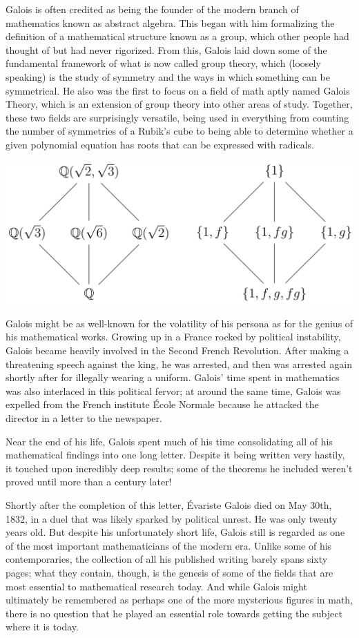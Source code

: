 \documentclass{article}
\begin{document}
Galois is often credited as being the founder of the modern branch of mathematics known as abstract algebra. This began with him formalizing the definition of a mathematical structure known as a group, which other people had thought of but had never rigorized. From this, Galois laid down some of the fundamental framework of what is now called group theory, which (loosely speaking) is the study of symmetry and the ways in which something can be symmetrical. He also was the first to focus on a field of math aptly named Galois Theory, which is an extension of group theory into other areas of study. Together, these two fields are surprisingly versatile, being used in everything from counting the number of symmetries of a Rubik’s cube to being able to determine whether a given polynomial equation has roots that can be expressed with radicals.

\begin{center}
    \includegraphics[scale=0.12]{images/galois-theory.png}
\end{center}

Galois might be as well-known for the volatility of his persona as for the genius of his mathematical works. Growing up in a France rocked by political instability, Galois became heavily involved in the Second French Revolution. After making a threatening speech against the king, he was arrested, and then was arrested again shortly after for illegally wearing a uniform. Galois’ time spent in mathematics was also interlaced in this political fervor; at around the same time, Galois was expelled from the French institute École Normale because he attacked the director in a letter to the newspaper. 

Near the end of his life, Galois spent much of his time consolidating all of his mathematical findings into one long letter. Despite it being written very hastily, it touched upon incredibly deep results; some of the theorems he included weren’t proved until more than a century later! 

Shortly after the completion of this letter, Évariste Galois died on May 30th, 1832, in a duel that was likely sparked by political unrest. He was only twenty years old. But despite his unfortunately short life, Galois still is regarded as one of the most important mathematicians of the modern era. Unlike some of his contemporaries, the collection of all his published writing barely spans sixty pages; what they contain, though, is the genesis of some of the fields that are most essential to mathematical research today. And while Galois might ultimately be remembered as perhaps one of the more mysterious figures in math, there is no question that he played an essential role towards getting the subject where it is today.
\end{document}
